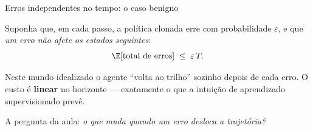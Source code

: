 \documentclass[aspectratio=169, 11pt]{beamer}
\begin{document}
\begin{frame}{Erros independentes no tempo: o caso benigno}

  Suponha que, em cada passo, a política clonada erre com probabilidade
  $\varepsilon$, e que \emph{um erro não afete os estados seguintes}:
  \[
    \E[\text{total de erros}] \;\le\; \varepsilon\,T .
  \]

  \begin{center}
  \end{center}

  \begin{ideiabox}
    Neste mundo idealizado o agente ``volta ao trilho'' sozinho depois de cada
    erro. O custo é \textbf{linear} no horizonte --- exatamente o que a intuição
    de aprendizado supervisionado prevê.
  \end{ideiabox}

  A pergunta da aula: \emph{o que muda quando um erro desloca a trajetória?}
\end{frame}
\end{document}
